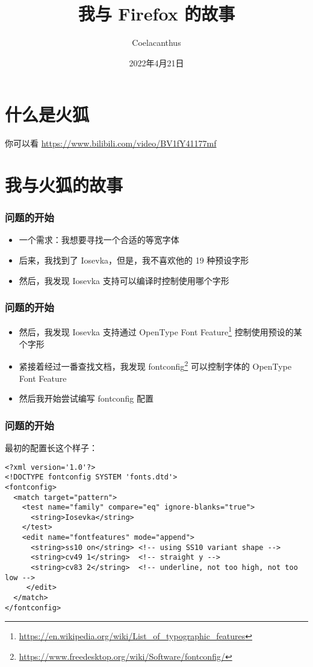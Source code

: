 \documentclass[UTF-8]{ctexbeamer}
\title{我与 Firefox 的故事}
\author{Coelacanthus}
\date{2022年4月21日}
\begin{document}
\frame{\titlepage}

\section{什么是火狐}
\begin{frame}

	你可以看 \url{https://www.bilibili.com/video/BV1fY41177mf}

\end{frame}

\section{我与火狐的故事}
\begin{frame}[fragile]
	\frametitle{问题的开始}
	
	\begin{itemize}[<+->]
		\item 一个需求：我想要寻找一个合适的等宽字体
		\item 后来，我找到了 Iosevka，但是，我不喜欢他的 19 种预设字形
		\item 然后，我发现 Iosevka 支持可以编译时控制使用哪个字形
	\end{itemize}
	
\end{frame}

\begin{frame}[fragile]
	\frametitle{问题的开始}

	\begin{itemize}[<+->]
		\item 然后，我发现 Iosevka 支持通过 OpenType Font Feature\footnote{\url{https://en.wikipedia.org/wiki/List_of_typographic_features}} 控制使用预设的某个字形
		\item 紧接着经过一番查找文档，我发现 fontconfig\footnote{\url{https://www.freedesktop.org/wiki/Software/fontconfig/}} 可以控制字体的 OpenType Font Feature
		\item 然后我开始尝试编写 fontconfig 配置
	\end{itemize}
	
\end{frame}

\begin{frame}[fragile]
	\frametitle{问题的开始}
	
	最初的配置长这个样子：
	\begin{verbatim}
<?xml version='1.0'?>
<!DOCTYPE fontconfig SYSTEM 'fonts.dtd'>
<fontconfig>
  <match target="pattern">
    <test name="family" compare="eq" ignore-blanks="true">
      <string>Iosevka</string>
    </test>
    <edit name="fontfeatures" mode="append">
      <string>ss10 on</string> <!-- using SS10 variant shape -->
      <string>cv49 1</string>  <!-- straight y -->
      <string>cv83 2</string>  <!-- underline, not too high, not too low -->
     </edit>
  </match>
</fontconfig>
	\end{verbatim}
	
\end{frame}
\end{document}

